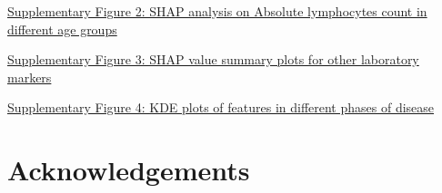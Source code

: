 \documentclass[final,3p,times,authoryear]{elsarticle}
\begin{document}
\href{run:supplementary/model_explanation_age2.png}{Supplementary Figure 2: SHAP analysis on Absolute lymphocytes count in different age groups}
\label{modelexplanation_age2}

\href{run:supplementary/modelexplanation2.png}{Supplementary Figure 3: SHAP value summary plots for other laboratory markers}
\label{modelexplanation2}

\href{run:supplementary/modelexplanation_kde.png}{Supplementary Figure 4: KDE plots of features in different phases of disease}
\label{modelexplanation_kde}

\section{Acknowledgements}\label{Acknowledgements}


 


 
\end{document}
